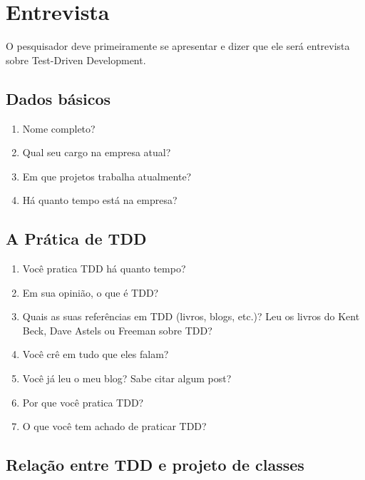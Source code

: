 \chapter{Entrevista}
\label{ape:entrevista}

O pesquisador deve primeiramente se apresentar e dizer que ele será entrevista
sobre Test-Driven Development.

\section{Dados básicos}

\begin{enumerate}
	\item Nome completo?

	\item Qual seu cargo na empresa atual?
	
	\item Em que projetos trabalha atualmente?
	
	\item Há quanto tempo está na empresa?

\end{enumerate}

\section{A Prática de TDD}

\begin{enumerate}
	\item Você pratica TDD há quanto tempo?

	\item Em sua opinião, o que é TDD?
	
	\item Quais as suas referências em TDD (livros, blogs, etc.)? 
		  Leu os livros do Kent Beck, Dave Astels ou Freeman sobre TDD?

	\item Você crê em tudo que eles falam?
	
	\item Você já leu o meu blog? Sabe citar algum post?
	
	\item Por que você pratica TDD?

	\item O que você tem achado de praticar TDD?

\end{enumerate}

\section{Relação entre TDD e projeto de classes}

